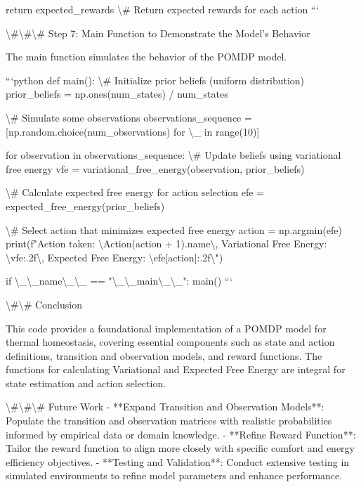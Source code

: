 \documentclass[11pt,a4paper]{article}
\begin{document}
    return expected_rewards  \textbackslash{}# Return expected rewards for each action
```

\textbackslash{}#\textbackslash{}#\textbackslash{}# Step 7: Main Function to Demonstrate the Model's Behavior

The main function simulates the behavior of the POMDP model.

```python
def main():
    \textbackslash{}# Initialize prior beliefs (uniform distribution)
    prior_beliefs = np.ones(num_states) / num_states

    \textbackslash{}# Simulate some observations
    observations_sequence = [np.random.choice(num_observations) for \textbackslash{}_ in range(10)]

    for observation in observations_sequence:
        \textbackslash{}# Update beliefs using variational free energy
        vfe = variational_free_energy(observation, prior_beliefs)

        \textbackslash{}# Calculate expected free energy for action selection
        efe = expected_free_energy(prior_beliefs)

        \textbackslash{}# Select action that minimizes expected free energy
        action = np.argmin(efe)
        print(f"Action taken: \textbackslash{}{Action(action + 1).name\textbackslash{}}, Variational Free Energy: \textbackslash{}{vfe:.2f\textbackslash{}}, Expected Free Energy: \textbackslash{}{efe[action]:.2f\textbackslash{}}")

if \textbackslash{}_\textbackslash{}_name\textbackslash{}_\textbackslash{}_ == "\textbackslash{}_\textbackslash{}_main\textbackslash{}_\textbackslash{}_":
    main()
```

\textbackslash{}#\textbackslash{}# Conclusion

This code provides a foundational implementation of a POMDP model for thermal homeostasis, covering essential components such as state and action definitions, transition and observation models, and reward functions. The functions for calculating Variational and Expected Free Energy are integral for state estimation and action selection.

\textbackslash{}#\textbackslash{}#\textbackslash{}# Future Work
- **Expand Transition and Observation Models**: Populate the transition and observation matrices with realistic probabilities informed by empirical data or domain knowledge.
- **Refine Reward Function**: Tailor the reward function to align more closely with specific comfort and energy efficiency objectives.
- **Testing and Validation**: Conduct extensive testing in simulated environments to refine model parameters and enhance performance.
\end{document}
